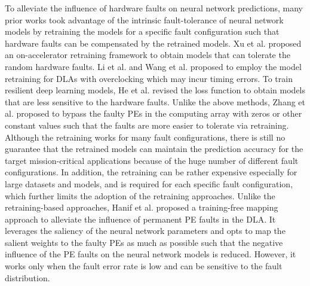 To alleviate the influence of hardware faults on neural network predictions, many prior works \cite{error2018date} \cite{energy2018kim} \cite{axtrain2018he} took advantage of the intrinsic fault-tolerance of neural network models by retraining the models for a specific fault configuration such that hardware faults can be compensated by the retrained models. Xu et al. \cite{xu2019resilient} proposed an on-accelerator retraining framework to obtain models that can tolerate the random hardware faults. Li et al. \cite{li2019squeezing} and Wang et al. \cite{wang2017resilience} proposed to employ the model retraining for DLAs with overclocking which may incur timing errors. To train resilient deep learning models, He et al. \cite{axtrain2018he} revised the loss function to obtain models that are less sensitive to the hardware faults. Unlike the above methods, Zhang et al. \cite{analyzing2018vts} \cite{zhang2019fault} proposed to bypass the faulty PEs in the computing array with zeros or other constant values such that the faults are more easier to tolerate via retraining. Although the retraining works for many fault configurations, there is still no guarantee that the retrained models can maintain the prediction accuracy for the target mission-critical applications because of the huge number of different fault configurations. In addition, the retraining can be rather expensive especially for large datasets and models, and is required for each specific fault configuration, which further limits the adoption of the retraining approaches. Unlike the retraining-based approaches, Hanif et al. \cite{abdullah2020salvagednn} proposed a training-free mapping approach to alleviate the influence of permanent PE faults in the DLA. It leverages the saliency of the neural network parameters and opts to map the salient weights to the faulty PEs as much as possible such that the negative influence of the PE faults on the neural network models is reduced. However, it works only when the fault error rate is low and can be sensitive to the fault distribution.  

